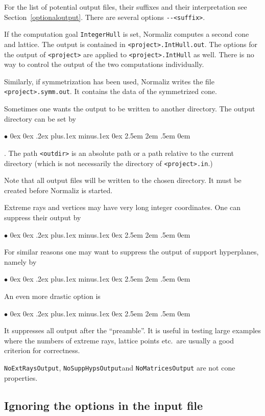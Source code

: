 \documentclass[12pt,a4paper]{scrartcl}
\newcommand{\stdli}{ \topsep0ex \partopsep0ex %
\parsep.2ex plus.1ex minus.1ex \itemsep0ex%
\leftmargin2.5em \labelwidth2em \labelsep.5em \rightmargin0em}%
\renewenvironment{itemize}{\begin{list}{{$\bullet$}}{\stdli}}{\end{list}}
\theoremstyle{definition}
\def\itemtt[#1]{\item[\textbf{\ttt{#1}}]}
\def\ttt{\texttt}
\begin{document}
For the list of potential output files, their suffixes and their interpretation
see Section~\ref{optionaloutput}. There are several options \verb|--<suffix>|.

If the computation goal \verb|IntegerHull| is set, Normaliz computes a second cone and lattice. The output is contained in \verb|<project>.IntHull.out|. The options for the output of \verb|<project>| are applied to \verb|<project>.IntHull| as well. There is no way to control the output of the two computations individually.

Similarly, if symmetrization has been used, Normaliz writes the file \verb|<project>.symm.out|. It contains the data of the symmetrized cone.

Sometimes one wants the output to be written to another directory. The output directory can be set by
\begin{itemize}
	\itemtt[{-}{-OutputDir=<outdir>}]. The path \ttt{<outdir>} is an absolute path or a path relative to the current directory (which is not necessarily the directory of \verb|<project>.in|.)
\end{itemize}
Note that all output files will be written to the chosen directory. It must be created before Normaliz is started.

Extreme rays and vertices may have very long integer coordinates. One can suppress their output by
\begin{itemize}
	\itemtt[NoExtRaysOutput]
\end{itemize}
For similar reasons one may want to suppress the output of support hyperplanes, namely by
\begin{itemize}
	\itemtt[NoSuppHypsOutput]
\end{itemize}

An even more drastic option is
\begin{itemize}
	\itemtt[NoMatricesOutput]
\end{itemize}
It suppresses all output after the ``preamble''. It is useful in testing large examples where the numbers of extreme rays, lattice points etc.\ are usually a good criterion for correctness.

\verb|NoExtRaysOutput|, \verb|NoSuppHypsOutput|and \verb|NoMatricesOutput| are not cone properties.

\subsection{Ignoring the options in the input file}
\end{document}
